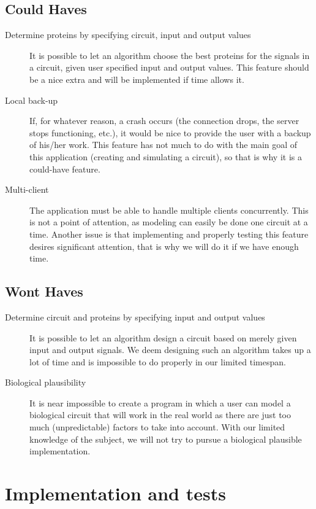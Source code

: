 \documentclass[a4paper]{article}
\begin{document}
\subsection{Could Haves}
\begin{description}
\item[Determine proteins by specifying circuit, input and output values] It is possible to let an algorithm choose the best proteins for the signals in a circuit, given user specified input and output values. This feature should be a nice extra and will be implemented if time allows it.
\item[Local back-up] If, for whatever reason, a crash occurs (the connection drops, the server stops functioning, etc.), it would be nice to provide the user with a backup of his/her work. This feature has not much to do with the main goal of this application (creating and simulating a circuit), so that is why it is a could-have feature.
\item[Multi-client] The application must be able to handle multiple clients concurrently. This is not a point of attention, as modeling can easily be done one circuit at a time. Another issue is that implementing and properly testing this feature desires significant attention, that is why we will do it if we have enough time.
\end{description}

\subsection{Wont Haves}
\begin{description}
\item[Determine circuit and proteins by specifying input and output values] It is possible to let an algorithm design a circuit based on merely given input and output signals. We deem designing such an algorithm takes up a lot of time and is impossible to do properly in our limited timespan.
\item[Biological plausibility] It is near impossible to create a program in which a user can model a biological circuit that will work in the real world as there are just too much (unpredictable) factors to take into account. With our limited knowledge of the subject, we will not try to pursue a biological plausible implementation.
\end{description}

\section{Implementation and tests}
\end{document}
